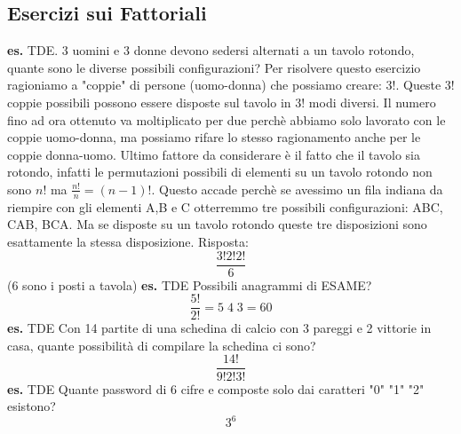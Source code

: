 \subsection*{Esercizi sui Fattoriali}
\textbf{es.} TDE. 3 uomini e 3 donne devono sedersi alternati a un tavolo rotondo, quante sono le diverse possibili configurazioni?
\newline
Per risolvere questo esercizio ragioniamo a "coppie" di persone (uomo-donna)  che possiamo creare: $3!$.
\newline
Queste $3!$ coppie possibili possono essere disposte sul tavolo in $3!$ modi diversi.
\newline
Il numero fino ad ora ottenuto va moltiplicato per due perchè abbiamo solo lavorato con le coppie uomo-donna, ma possiamo rifare lo stesso ragionamento anche per le coppie donna-uomo.
\newline
Ultimo fattore da considerare è il fatto che il tavolo sia rotondo, infatti le permutazioni possibili di elementi su un tavolo rotondo non sono $n!$ ma $\frac{n!}{n} = (n-1)!$. Questo accade perchè se avessimo un fila indiana da riempire con gli elementi A,B e C otterremmo tre possibili configurazioni: ABC, CAB, BCA. Ma se disposte su un tavolo rotondo queste tre disposizioni sono esattamente la stessa disposizione.
\newline
Risposta:
\[
    \frac{3!2!2!}{6}
\] 
($6$ sono i posti a tavola)
\newline
\newline
\textbf{es.} TDE
\newline
Possibili anagrammi di ESAME?
\[
    \frac{5!}{2!} = 5\;4\;3 = 60
\] 
\newline
\newline
\textbf{es.} TDE
\newline
Con 14 partite di una schedina di calcio con 3 pareggi e 2 vittorie in casa, quante possibilità di compilare la schedina ci sono?
\newline
\[
    \frac{14!}{9!2!3!}
\] 
\newline
\textbf{es.} TDE
\newline
Quante password di $6$ cifre e composte solo dai caratteri "0" "1" "2" esistono?
\[
    3^6
\] 

